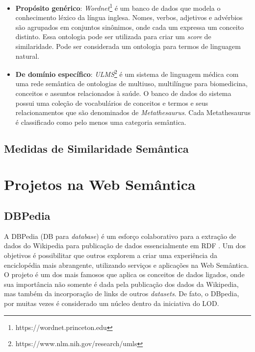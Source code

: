 \begin{itemize}
	\item{\textbf{Propósito genérico}: \textit{Wordnet}\footnote{https://wordnet.princeton.edu} é um banco de dados que modela o conhecimento léxico da língua inglesa. Nomes, verbos, adjetivos e advérbios são agrupados em conjuntos sinônimos, onde cada um expressa um conceito distinto. Essa ontologia pode ser utilizada para criar um \textit{score} de similaridade. Pode ser considerada um ontologia para termos de linguagem natural.}
	
	\item{\textbf{De domínio específico}: \textit{ULMS}\footnote{https://www.nlm.nih.gov/research/umls} é um sistema de linguagem médica com uma rede semântica de ontologias de multiuso, multilíngue para biomedicina, conceitos e assuntos relacionados à saúde. O banco de dados do sistema possui uma coleção de vocabulários de conceitos e termos e seus relacionamentos que são denominados de \textit{Metathesaurus}. Cada Metathesaurus é classificado como pelo menos uma categoria semântica.}	
\end{itemize}

\subsection{Medidas de Similaridade Semântica}



\section{Projetos na Web Semântica}

\subsection{DBPedia}

A DBPedia (DB para \textit{database}) é um esforço colaborativo para a extração de dados do Wikipedia para publicação de dados essencialmente em RDF \citep{Auer:2007:DNW:1785162.1785216}. Um dos objetivos é possibilitar que outros explorem a criar uma experiência da enciclopédia mais abrangente, utilizando serviços e aplicações na Web Semântica. O projeto é um dos mais famosos que aplica os conceitos de dados ligados, onde sua importância não somente é dada pela publicação dos dados da Wikipedia, mas também da incorporação de links de outros \textit{datasets}. De fato, o DBpedia, por muitas vezes é considerado um núcleo dentro da iniciativa do LOD.


